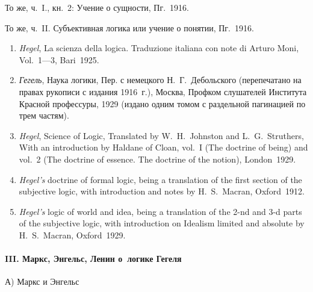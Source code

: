 То же, ч.~I., кн.~2: Учение о сущности, Пг.~1916.

То же, ч.~II. Субъективная логика или учение о понятии, Пг.~1916.

\begin{enumerate}
\item
{\em Hegel}, La scienza della logica. Traduzione italiana con note di
Arturo Moni, Vol.~1---3, Bari~1925.

\item
{\em Гегель}, Наука логики, Пер. с немецкого Н.~Г.~Дебольского
(перепечатано на правах рукописи с издания 1916~г.), Москва, Профком
слушателей Института Красной профессуры, 1929 (издано одним томом с
раздельной пагинацией по трем частям).

\item
{\em Hegel}, Science of Logic, Translated by W.~H.~Johnston and
L.~G.~Struthers, With an introduction by Haldane of Cloan, vol.~I
(The doctrine of being) and vol.~2 (The doctrine of essence. The doctrine of
 the notion), London~1929.

\item{\em Hegel's} doctrine of formal logic, being a translation of the first
section of the subjective logic, with introduction and notes by
H.~S.~Macran, Oxford~1912.

\item{\em Hegel's} logic of world and idea, being a translation of the 2-nd and
3-d parts of the subjective logic, with introduction on Idealism limited and
absolute by H.~S.~Macran, Oxford~1929.
\end{enumerate}

\paragraph[III. Маркс, Энгельс, Ленин о~логике Гегеля]
{III. Маркс, Энгельс, Ленин о~логике Гегеля}

{\centering А) Маркс и Энгельс \par}

